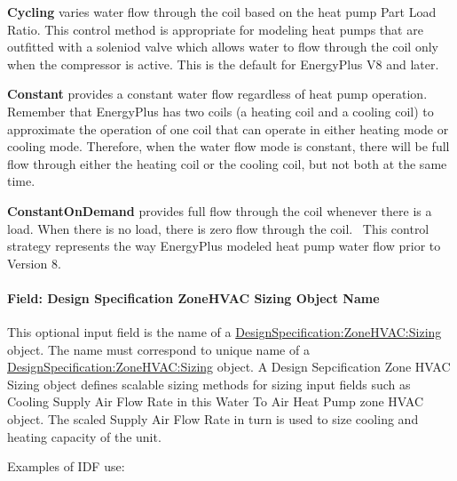 \textbf{Cycling} varies water flow through the coil based on the heat pump Part Load Ratio. This control method is appropriate for modeling heat pumps that are outfitted with a soleniod valve which allows water to flow through the coil only when the compressor is active. This is the default for EnergyPlus V8 and later.

\textbf{Constant} provides a constant water flow regardless of heat pump operation. Remember that EnergyPlus has two coils (a heating coil and a cooling coil) to approximate the operation of one coil that can operate in either heating mode or cooling mode. Therefore, when the water flow mode is constant, there will be full flow through either the heating coil or the cooling coil, but not both at the same time.

\textbf{ConstantOnDemand} provides full flow through the coil whenever there is a load. When there is no load, there is zero flow through the coil.~ This control strategy represents the way EnergyPlus modeled heat pump water flow prior to Version 8.

\paragraph{Field: Design Specification ZoneHVAC Sizing Object Name}\label{field-design-specification-zonehvac-sizing-object-name-8}

This optional input field is the name of a \hyperref[designspecificationzonehvacsizing]{DesignSpecification:ZoneHVAC:Sizing} object. The name must correspond to unique name of a \hyperref[designspecificationzonehvacsizing]{DesignSpecification:ZoneHVAC:Sizing} object. A Design Sepcification Zone HVAC Sizing object defines scalable sizing methods for sizing input fields such as Cooling Supply Air Flow Rate in this Water To Air Heat Pump zone HVAC object. The scaled Supply Air Flow Rate in turn is used to size cooling and heating capacity of the unit.

Examples of IDF use:

